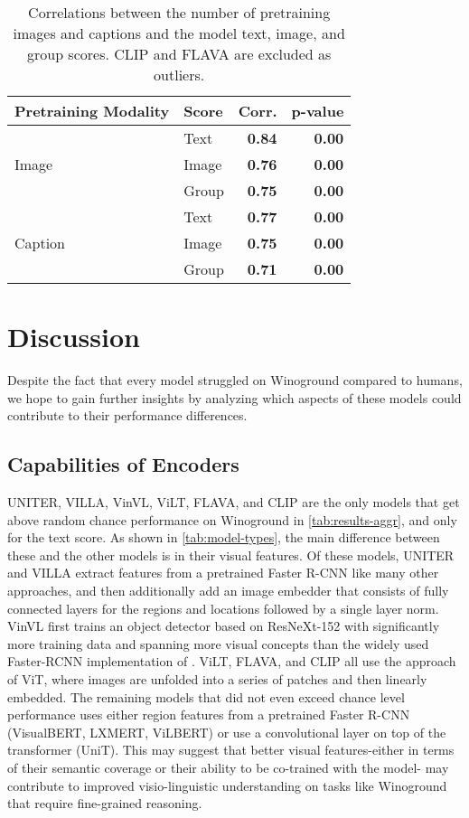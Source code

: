 \documentclass[10pt,twocolumn,letterpaper]{article}
\begin{document}
\begin{table}[t]
\centering
\begin{tabular}{llrr}
\toprule
Pretraining Modality & Score & Corr. & p-value\\\midrule
 & Text & \textbf{0.84} & \textbf{0.00} \\
 Image & Image & \textbf{0.76} & \textbf{0.00} \\
 & Group & \textbf{0.75} & \textbf{0.00} \\\midrule
 & Text  & \textbf{0.77} & \textbf{0.00} \\
 Caption & Image & \textbf{0.75} & \textbf{0.00} \\
 & Group & \textbf{0.71} & \textbf{0.00} \\
\bottomrule
\end{tabular}
\caption{Correlations between the number of pretraining images and captions and the model text, image, and group scores. CLIP and FLAVA are excluded as outliers.}
\label{tab:data-size-correlations}
\end{table}

\section{Discussion}

Despite the fact that every model struggled on Winoground compared to humans, we hope to gain further insights by analyzing which aspects of these models could contribute to their performance differences.

\subsection{Capabilities of Encoders}
UNITER, VILLA, VinVL, ViLT, FLAVA, and CLIP are the only models that get above random chance performance on Winoground in \cref{tab:results-aggr}, and only for the text score.
As shown in \cref{tab:model-types}, the main difference between these and the other models is in their visual features.
Of these models, UNITER and VILLA extract features from a pretrained Faster R-CNN like many other approaches, and then additionally add an image embedder that consists of fully connected layers for the regions and locations followed by a single layer norm.
VinVL first trains an object detector based on ResNeXt-152 with significantly more training data and spanning more visual concepts than the widely used Faster-RCNN implementation of \cite{ren2015faster}.
ViLT, FLAVA, and CLIP all use the approach of ViT, where images are unfolded into a series of patches and then linearly embedded.
The remaining models that did not even exceed chance level performance uses either region features from a pretrained Faster R-CNN (VisualBERT, LXMERT, ViLBERT) or use a convolutional layer on top of the transformer (UniT).
This may suggest that better visual features-either in terms of their semantic coverage or their ability to be co-trained with the model- may contribute to improved visio-linguistic understanding on tasks like Winoground that require fine-grained reasoning.
\fi 
\end{document}
